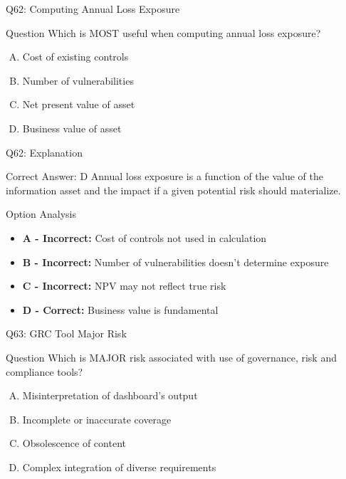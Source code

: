 \documentclass{beamer}
\begin{document}
	\begin{frame}{Q62: Computing Annual Loss Exposure}
		\begin{block}{Question}
			Which is MOST useful when computing annual loss exposure?
		\end{block}
		\begin{enumerate}[(A)]
			\item Cost of existing controls
			\item Number of vulnerabilities
			\item Net present value of asset
			\item Business value of asset
		\end{enumerate}
	\end{frame}
	
	\begin{frame}{Q62: Explanation}
		\begin{block}{Correct Answer: D}
			Annual loss exposure is a function of the value of the information asset and the impact if a given potential risk should materialize.
		\end{block}
		\begin{block}{Option Analysis}
			\begin{itemize}
				\item \textbf{A - Incorrect:} Cost of controls not used in calculation
				\item \textbf{B - Incorrect:} Number of vulnerabilities doesn't determine exposure
				\item \textbf{C - Incorrect:} NPV may not reflect true risk
				\item \textbf{D - Correct:} Business value is fundamental
			\end{itemize}
		\end{block}
	\end{frame}
	
	\begin{frame}{Q63: GRC Tool Major Risk}
		\begin{block}{Question}
			Which is MAJOR risk associated with use of governance, risk and compliance tools?
		\end{block}
		\begin{enumerate}[(A)]
			\item Misinterpretation of dashboard's output
			\item Incomplete or inaccurate coverage
			\item Obsolescence of content
			\item Complex integration of diverse requirements
		\end{enumerate}
	\end{frame}
	
\end{document}
